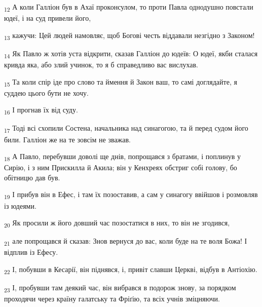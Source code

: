 \begin{tcolorbox}
\textsubscript{12} А коли Галліон був в Ахаї проконсулом, то проти Павла однодушно повстали юдеї, і на суд привели його,
\end{tcolorbox}
\begin{tcolorbox}
\textsubscript{13} кажучи: Цей людей намовляє, щоб Богові честь віддавали незгідно з Законом!
\end{tcolorbox}
\begin{tcolorbox}
\textsubscript{14} Як Павло ж хотів уста відкрити, сказав Галліон до юдеїв: О юдеї, якби сталася кривда яка, або злий учинок, то я б справедливо вас вислухав.
\end{tcolorbox}
\begin{tcolorbox}
\textsubscript{15} Та коли спір іде про слово та ймення й Закон ваш, то самі доглядайте, я суддею цього бути не хочу.
\end{tcolorbox}
\begin{tcolorbox}
\textsubscript{16} І прогнав їх від суду.
\end{tcolorbox}
\begin{tcolorbox}
\textsubscript{17} Тоді всі схопили Состена, начальника над синагогою, та й перед судом його били. Галліон же на те зовсім не зважав.
\end{tcolorbox}
\begin{tcolorbox}
\textsubscript{18} А Павло, перебувши доволі ще днів, попрощався з братами, і поплинув у Сирію, і з ним Прискилла й Акила; він у Кенхреях обстриг собі голову, бо обітницю дав був.
\end{tcolorbox}
\begin{tcolorbox}
\textsubscript{19} І прибув він в Ефес, і там їх позоставив, а сам у синагогу ввійшов і розмовляв із юдеями.
\end{tcolorbox}
\begin{tcolorbox}
\textsubscript{20} Як просили ж його довший час позостатися в них, то він не згодився,
\end{tcolorbox}
\begin{tcolorbox}
\textsubscript{21} але попрощався й сказав: Знов вернуся до вас, коли буде на те воля Божа! І відплив із Ефесу.
\end{tcolorbox}
\begin{tcolorbox}
\textsubscript{22} І, побувши в Кесарії, він піднявся, і, привіт славши Церкві, відбув в Антіохію.
\end{tcolorbox}
\begin{tcolorbox}
\textsubscript{23} І, пробувши там деякий час, він вибрався в подорож знову, за порядком проходячи через країну галатську та Фріґію, та всіх учнів зміцняючи.
\end{tcolorbox}
